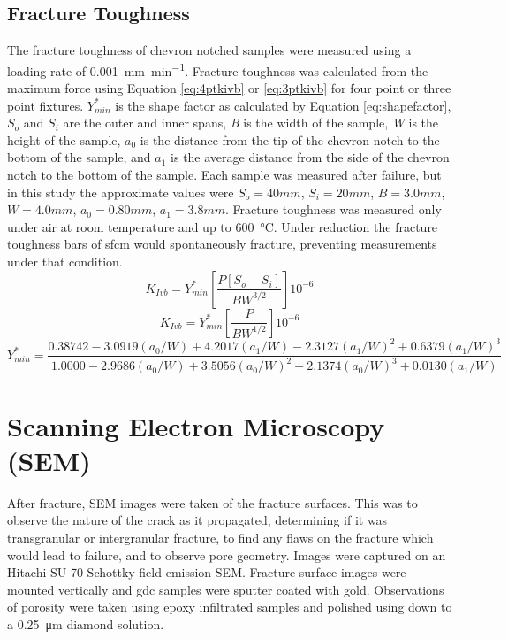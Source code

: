     \subsection{Fracture Toughness}
        The fracture toughness of chevron notched samples were measured using a loading rate of \SI{0.001}{mm\per\minute}.
        Fracture toughness was calculated from the maximum force using Equation \ref{eq:4ptkivb} or \ref{eq:3ptkivb} for four point or three point fixtures.\cite{ASTM2016a,Wu1984}
        $Y^{*}_{min}$ is the shape factor as calculated by Equation \ref{eq:shapefactor}, $S_o$ and $S_i$ are the outer and inner spans, \textit{B} is the width of the sample, \textit{W} is the height of the sample, $a_0$ is the distance from the tip of the chevron notch to the bottom of the sample, and $a_1$ is the average distance from the side of the chevron notch to the bottom of the sample.
        Each sample was measured after failure, but in this study the approximate values were $S_o = 40 mm$, $S_i = 20 mm$, $B = 3.0 mm$, $W = 4.0 mm$, $a_0 = 0.80 mm$, $a_1 = 3.8 mm$.
        Fracture toughness was measured only under air at room temperature and up to \SI{600}{\celsius}.
        Under reduction the fracture toughness bars of \gls{sfcm} would spontaneously fracture, preventing measurements under that condition.
        \begin{equation}
            K_{Ivb} = Y^{*}_{min}  \left [\frac{P[S_o-S_i]}{BW^{3/2}}\right ]10^{-6}
            \label{eq:4ptkivb}
        \end{equation}
        \begin{equation}
            K_{Ivb} = Y^{*}_{min}  \left [\frac{P}{BW^{1/2}}\right ]10^{-6}
            \label{eq:3ptkivb}
        \end{equation}
        \begin{equation}
            Y^{*}_{min} = \frac{0.38742-3.0919(a_0/W)+4.2017(a_1/W)-2.3127(a_1/W)^2+0.6379(a_1/W)^3}{1.0000-2.9686(a_0/W)+3.5056(a_0/W)^2-2.1374(a_0/W)^3+0.0130(a_1/W)}
            \label{eq:shapefactor}
        \end{equation}

    \section{Scanning Electron Microscopy (SEM)}
        After fracture, SEM images were taken of the fracture surfaces.
        This was to observe the nature of the crack as it propagated, determining if it was transgranular or intergranular fracture, to find any flaws on the fracture which would lead to failure, and to observe pore geometry.
        Images were captured on an Hitachi SU-70 Schottky field emission SEM.
        Fracture surface images were mounted vertically and \gls{gdc} samples were sputter coated with gold.
        Observations of porosity were taken using epoxy infiltrated samples and polished using down to a \SI{0.25}{\micro\meter} diamond solution.
